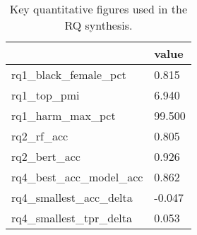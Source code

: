 \begin{table}[htbp]
\centering
\caption{Key quantitative figures used in the RQ synthesis.}
\label{tab:rq-key-numbers}
\begin{tabular}{ll}
\toprule
 & value \\
\midrule
rq1\_black\_female\_pct & 0.815 \\
rq1\_top\_pmi & 6.940 \\
rq1\_harm\_max\_pct & 99.500 \\
rq2\_rf\_acc & 0.805 \\
rq2\_bert\_acc & 0.926 \\
rq4\_best\_acc\_model\_acc & 0.862 \\
rq4\_smallest\_acc\_delta & -0.047 \\
rq4\_smallest\_tpr\_delta & 0.053 \\
\bottomrule
\end{tabular}

\end{table}